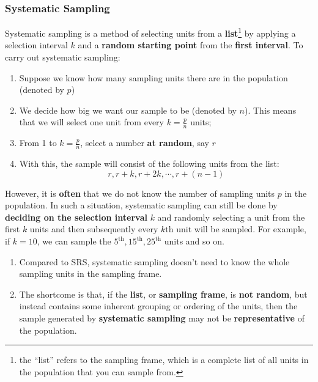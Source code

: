 \documentclass[math,code]{amznotes}
\theoremstyle{remark}
\begin{document}
\subsubsection{Systematic Sampling}
Systematic sampling is a method of selecting units from a \textbf{list}\footnote{the ``list'' refers to the sampling frame, which is a complete list of all units in the population that you can sample from.} by applying a selection interval $k$ and a \textbf{random starting point} from the \textbf{first interval}. To carry out systematic sampling:
\begin{enumerate}
    \item Suppose we know how many sampling units there are in the population (denoted by $p$)
    \item We decide how big we want our sample to be (denoted by $n$). This means that we will select one unit from every $k=\frac{p}{n}$ units;
    \item From 1 to $k=\frac{p}{n}$, select a number \textbf{at random}, say $r$
    \item With this, the sample will consist of the following units from the list:
    \begin{displaymath}
        r, r+k, r+2k, \cdots,r+(n-1)
    \end{displaymath}
\end{enumerate}
However, it is \textbf{often} that we do not know the number of sampling units $p$ in the population. In such a situation, systematic sampling can still be done by \textbf{deciding on the selection interval} $k$ and randomly selecting a unit from the first $k$ units and then subsequently every $k$th unit will be sampled. For example, if $k = 10$, we can sample the $5^\text{th}, 15^\text{th}, 25^\text{th}$ units and so on.
\begin{notebox}
    \begin{enumerate}
        \item Compared to SRS, systematic sampling doesn't need to know the whole sampling units in the sampling frame.
        \item The shortcome is that, if the \textbf{list}, or \textbf{sampling frame}, is \textbf{not random}, but instead contains some inherent grouping or ordering of the units, then the sample generated by \textbf{systematic sampling} may not be \textbf{representative} of the population.
    \end{enumerate}
\end{notebox}
\end{document}
